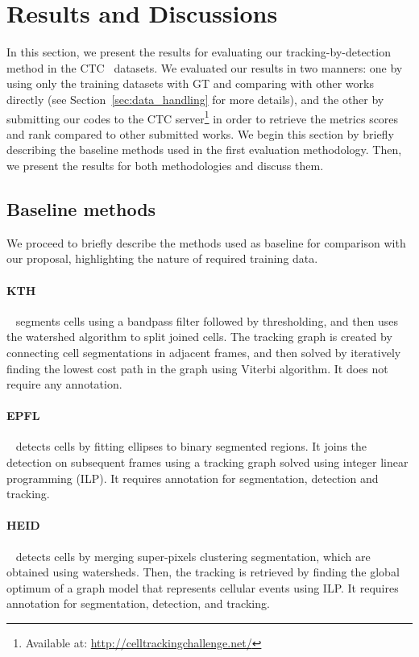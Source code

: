 \documentclass{article}
\begin{document}
\section{Results and Discussions}\label{sec:results}

In this section, we present the results for evaluating our tracking-by-detection method in the CTC~\cite{isbi} datasets. We evaluated our results in two manners: one by using only the training datasets with GT and comparing with other works directly (see Section~\ref{sec:data_handling} for more details), and the other by submitting our codes to the CTC server\footnote{Available at: \url{http://celltrackingchallenge.net/}} in order to retrieve the metrics scores and rank compared to other submitted works. We begin this section by briefly describing the baseline methods used in the first evaluation methodology. Then, we present the results for both methodologies and discuss them.

\subsection{Baseline methods}

We proceed to briefly describe the methods used as baseline for comparison with our proposal, highlighting the nature of required training data.

\paragraph{KTH}~\cite{kth} segments cells using a bandpass filter followed by thresholding, and then uses the watershed algorithm to split joined cells. The tracking graph is created by connecting cell segmentations in adjacent frames, and then solved by iteratively finding the lowest cost path in the graph using Viterbi algorithm. It does not require any annotation.

\paragraph{EPFL}~\cite{epflheid} detects cells by fitting ellipses to binary segmented regions. It joins the detection on subsequent frames using a tracking graph solved using integer linear programming (ILP). It requires annotation for segmentation, detection and tracking.

\paragraph{HEID}~\cite{epflheid} detects cells by merging super-pixels clustering segmentation, which are obtained using watersheds. Then, the tracking is retrieved by finding the global optimum of a graph model that represents cellular events using ILP. It requires annotation for segmentation, detection, and tracking.
\end{document}

